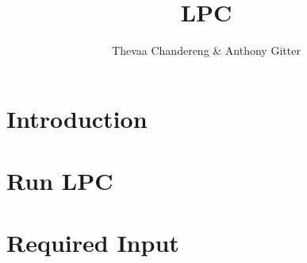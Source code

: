 \documentclass{article}
\title{LPC}
\author{Thevaa Chandereng \& Anthony Gitter}
\begin{document}


\maketitle


\tableofcontents

\newpage

\section{Introduction}

\section{Run LPC}

\section{Required Input}
\end{document}
